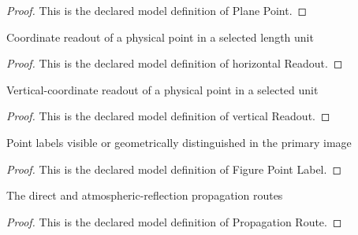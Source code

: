 \begin{proof}
  This is the declared model definition of Plane Point.
\end{proof}
\begin{definition}
  \label{def:physics:phyx-mini-0329:phyxminiproblems-problemphyxmini0329-horizontalreadout}
  Coordinate readout of a physical point in a selected length unit
\end{definition}
\begin{proof}
  This is the declared model definition of horizontal Readout.
\end{proof}
\begin{definition}
  \label{def:physics:phyx-mini-0329:phyxminiproblems-problemphyxmini0329-verticalreadout}
  Vertical-coordinate readout of a physical point in a selected unit
\end{definition}
\begin{proof}
  This is the declared model definition of vertical Readout.
\end{proof}
\begin{definition}
  \label{def:physics:phyx-mini-0329:phyxminiproblems-problemphyxmini0329-figurepointlabel}
  Point labels visible or geometrically distinguished in the primary image
\end{definition}
\begin{proof}
  This is the declared model definition of Figure Point Label.
\end{proof}
\begin{definition}
  \label{def:physics:phyx-mini-0329:phyxminiproblems-problemphyxmini0329-propagationroute}
  The direct and atmospheric-reflection propagation routes
\end{definition}
\begin{proof}
  This is the declared model definition of Propagation Route.
\end{proof}
